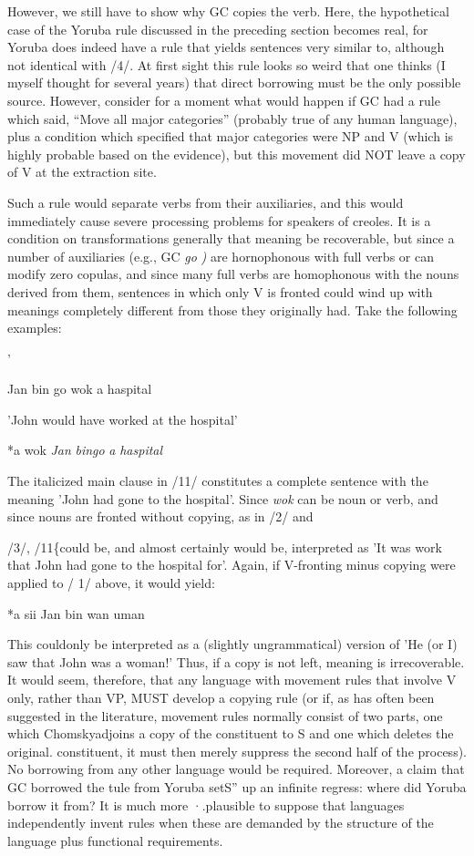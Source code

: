 However, we still have to show why GC copies the verb. Here, the hypothetical case of the Yoruba rule discussed in the preceding section becomes real, for Yoruba does indeed have a rule that yields sentences very similar to, although not identical with /4/. At first sight this rule looks so weird that one thinks (I myself thought for several years) that direct borrowing must be the only possible source. However, consider for a moment what would happen if GC had a rule which said, ``Move all major categories'' (probably true of any human lan\-guage), plus a condition which specified that major categories were NP and V (which is highly probable based on the evidence), but this movement did NOT leave a copy of V at the extraction site.

Such a rule would separate verbs from their auxiliaries, and this would immediately cause severe processing problems for speakers of creoles. It is a condition on transformations generally that meaning be recoverable, but since a number of auxiliaries (e.g., GC \textit{go} \textit{)} are hornoph\-onous with full verbs or can modify zero copulas, and since many full verbs are homophonous with the nouns derived from them, sentences in which only V is fronted could wind up with meanings completely different from those they originally had. Take the following examples:

'


\ea\label{ex:10}
 Jan bin go wok a haspital
\glt
\z

'John would have worked at the hospital'

\ea\label{ex:11}
 *a wok \textit{Jan} \textit{bi}\textit{n}\textit{go} \textit{a} \textit{haspital}
\glt
\z

The italicized main clause in /11/ constitutes a complete sentence with the meaning 'John had gone to the hospital'. Since \textit{wok} can be noun or verb, and since nouns are fronted without copying, as in /2/ and

/3/, /11\{could be, and almost certainly would be, interpreted as 'It was work that John had gone to the hospital for'. Again, if V-fronting minus copying were applied to / 1/ above, it would yield:

\ea\label{ex:12}
 *a sii Jan bin wan uman
\glt
\z

This couldonly be interpreted as a (slightly ungrammatical) version of 'He (or I) saw that John was a woman!' Thus, if a copy is not left, meaning is irrecoverable. It would seem, therefore, that any language with movement rules that involve V only, rather than VP, MUST de\-velop a copying rule (or if, as has often been suggested in the literature, movement rules normally consist of two parts, one which Chomsky\-adjoins a copy of the constituent to S and one which deletes the original. constituent, it must then merely suppress the second half of the process). No borrowing from any other language would be required. Moreover, a claim that GC borrowed the tule from Yoruba setS'' up an infinite regress: where did Yoruba borrow it from? It is much more ·.plausible to suppose that languages independently invent rules when these are demanded by the structure of the language plus func\-tional requirements.

